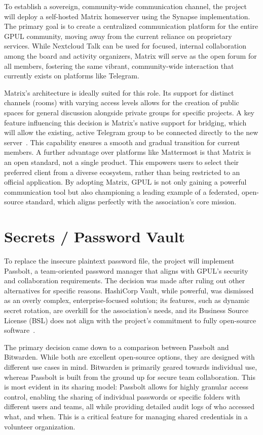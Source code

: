 To establish a sovereign, community-wide communication channel, the project will deploy a self-hosted Matrix homeserver using the Synapse implementation. The primary goal is to create a centralized communication platform for the entire GPUL community, moving away from the current reliance on proprietary services. While Nextcloud Talk can be used for focused, internal collaboration among the board and activity organizers, Matrix will serve as the open forum for all members, fostering the same vibrant, community-wide interaction that currently exists on platforms like Telegram.

Matrix's architecture is ideally suited for this role. Its support for distinct channels (rooms) with varying access levels allows for the creation of public spaces for general discussion alongside private groups for specific projects. A key feature influencing this decision is Matrix's native support for bridging, which will allow the existing, active Telegram group to be connected directly to the new server~\cite{matrix-docs}. This capability ensures a smooth and gradual transition for current members. A further advantage over platforms like Mattermost is that Matrix is an open standard, not a single product. This empowers users to select their preferred client from a diverse ecosystem, rather than being restricted to an official application. By adopting Matrix, GPUL is not only gaining a powerful communication tool but also championing a leading example of a federated, open-source standard, which aligns perfectly with the association's core mission.

\section{Secrets / Password Vault}

To replace the insecure plaintext password file, the project will implement Passbolt, a team-oriented password manager that aligns with GPUL's security and collaboration requirements. The decision was made after ruling out other alternatives for specific reasons. HashiCorp Vault, while powerful, was dismissed as an overly complex, enterprise-focused solution; its features, such as dynamic secret rotation, are overkill for the association's needs, and its Business Source License (BSL) does not align with the project's commitment to fully open-source software~\cite{vault-bsl}.

The primary decision came down to a comparison between Passbolt and Bitwarden. While both are excellent open-source options, they are designed with different use cases in mind. Bitwarden is primarily geared towards individual use, whereas Passbolt is built from the ground up for secure team collaboration. This is most evident in its sharing model: Passbolt allows for highly granular access control, enabling the sharing of individual passwords or specific folders with different users and teams, all while providing detailed audit logs of who accessed what, and when. This is a critical feature for managing shared credentials in a volunteer organization.

